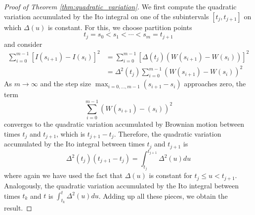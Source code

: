 \documentclass[\topdir/lecture\_notes.tex]{subfiles}
\begin{document}
\begin{optional}
\begin{proof}[Proof of Theorem \ref{thm:quadratic_variation}]
We first compute the quadratic variation accumulated by the Ito integral on one of the subintervals $\left[t_{j}, t_{j+1}\right]$ on which $\Delta(u)$ is constant. For this, we choose partition points
\begin{equation*}
t_{j}=s_{0}<s_{1}<\cdots<s_{m}=t_{j+1}
\end{equation*}
and consider
\begin{align}
\sum_{i=0}^{m-1}\left[I\left(s_{i+1}\right)-I\left(s_{i}\right)\right]^{2} & =\sum_{i=0}^{m-1}\left[\Delta\left(t_{j}\right)\left(W\left(s_{i+1}\right)-W\left(s_{i}\right)\right)\right]^{2} \\
& =\Delta^{2}\left(t_{j}\right) \sum_{i=0}^{m-1}\left(W\left(s_{i+1}\right)-W\left(s_{i}\right)\right)^{2}
\label{4.2.9}
\end{align}
As $m \rightarrow \infty$ and the step size $\max _{i=0, \ldots, m-1}\left(s_{i+1}-s_{i}\right)$ approaches zero, the term 
\[
\sum_{i=0}^{m-1}\left(W(s_{i+1})-(s_{i})\right)^{2}
\]
converges to the quadratic variation accumulated by Brownian motion between times $t_{j}$ and $t_{j+1}$, which is $t_{j+1}-t_{j}$. Therefore, the quadratic variation accumulated by the Ito integral between times $t_{j}$ and $t_{j+1}$ is
\begin{equation*}
\Delta^{2}\left(t_{j}\right)\left(t_{j+1}-t_{j}\right)=\int_{t_{j}}^{t_{j+1}} \Delta^{2}(u) d u
\end{equation*}
where again we have used the fact that $\Delta(u)$ is constant for $t_{j} \leq u<t_{j+1}$. Analogously, the quadratic variation accumulated by the Ito integral between times $t_{k}$ and $t$ is $\int_{t_{k}}^{t} \Delta^{2}(u) d u$. Adding up all these pieces, we obtain the result.
\end{proof}
\end{optional}
\end{document}
